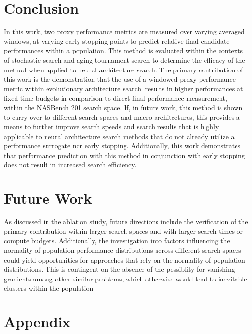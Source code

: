 \documentclass[twocolumn]{article}
\begin{document}
\section{Conclusion}

In this work, two proxy performance metrics are measured over varying averaged windows, at varying early stopping points to predict relative final candidate performances within a population.
This method is evaluated within the contexts of stochastic search and aging tournament search to determine the efficacy of the method when applied to neural architecture search.
The primary contribution of this work is the demonstration that the use of a windowed proxy performance metric within evolutionary architecture search,
results in higher performances at fixed time budgets in comparison to direct final performance measurement, within the NASBench 201 search space.
If, in future work, this method is shown to carry over to different search spaces and macro-architectures, this provides a
means to further improve search speeds and search results that is highly applicable to neural architecture search methods that do not already utilize a performance surrogate nor early stopping.
Additionally, this work demonstrates that performance prediction with this method in conjunction with early stopping does not result in increased search efficiency.

\section{Future Work}

As discussed in the ablation study, future directions include the verification of the primary contribution within larger search spaces and with larger search times or compute budgets.
Additionally, the investigation into factors influencing the normality of population performance distributions across different search spaces
could yield opportunities for approaches that rely on the normality of population distributions. 
This is contingent on the absence of the possiblity for vanishing gradients among other similar problems, which otherwise would
lead to inevitable clusters within the population.

\FloatBarrier



\FloatBarrier
\appendix
\section{Appendix}
\end{document}
